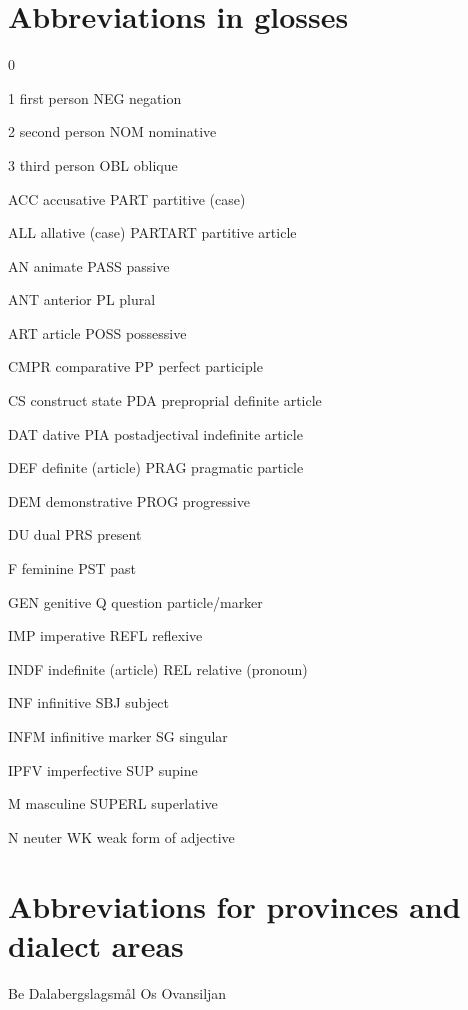 
\chapter{Abbreviations in glosses\footnotemark{}}
0

1  first person  NEG  negation

2  second person  NOM  nominative

3  third person  OBL  oblique

ACC  accusative  PART  partitive (case)

ALL  allative (case)  PARTART  partitive article

AN  animate  PASS  passive

ANT  anterior  PL  plural

ART  article  POSS  possessive

CMPR  comparative  PP  perfect participle

CS  construct state  PDA  preproprial definite article

DAT  dative  PIA  postadjectival indefinite article

DEF  definite (article)  PRAG  pragmatic particle

DEM  demonstrative  PROG  progressive

DU  dual  PRS  present

F  feminine  PST  past

GEN  genitive  Q  question particle/marker

IMP  imperative  REFL  reflexive

INDF  indefinite (article)  REL  relative (pronoun)

INF  infinitive  SBJ  subject

INFM  infinitive marker  SG  singular

IPFV  imperfective  SUP  supine

M  masculine  SUPERL  superlative

N  neuter  WK  weak form of adjective


\chapter{Abbreviations for provinces and dialect areas}
Be  Dalabergslagsmål  Os  Ovansiljan

